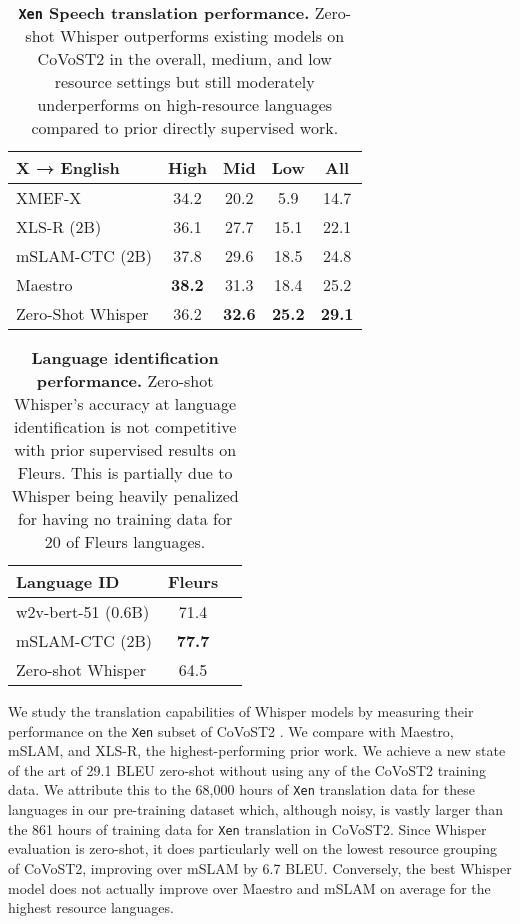 \documentclass[nohyperref]{article}
\theoremstyle{plain}
\theoremstyle{definition}
\theoremstyle{remark}
\begin{document}
\begin{table}[t]
\vskip 0.15in
\begin{center}
\begin{tabular}{l|ccc|c}
\toprule
 X → English & High & Mid & Low & All \\
\midrule
XMEF-X & 34.2 & 20.2 & 5.9 & 14.7 \\
XLS-R (2B) & 36.1 & 27.7 & 15.1 & 22.1 \\
mSLAM-CTC (2B) & 37.8 & 29.6 & 18.5 & 24.8 \\
Maestro & \textbf{38.2} & 31.3 & 18.4 & 25.2 \\
\midrule
Zero-Shot Whisper & 36.2 & \textbf{32.6} & \textbf{25.2} & \textbf{29.1} \\
\bottomrule
\end{tabular}
\caption{\textbf{\texttt{Xen} Speech translation performance.} Zero-shot Whisper outperforms existing models on CoVoST2 in the overall, medium, and low resource settings but still moderately underperforms on high-resource languages compared to prior directly supervised work.}
\label{translate_table}
\end{center}
\vspace{-1em}
\end{table}

\begin{table}[t]
\vskip 0.15in
\begin{center}
\begin{tabular}{l|cc}
\toprule
 Language ID & Fleurs \\
\midrule
w2v-bert-51 (0.6B) & 71.4 \\
mSLAM-CTC (2B) & \textbf{77.7} \\
\midrule
Zero-shot Whisper & 64.5 \\
\bottomrule
\end{tabular}
\caption{\textbf{Language identification performance.} Zero-shot Whisper's accuracy at language identification is not competitive with prior supervised results on Fleurs. This is partially due to Whisper being heavily penalized for having no training data for 20 of Fleurs languages.}
\label{lang_id_table}
\end{center}
\vspace{-1em}
\end{table}

We study the translation capabilities of Whisper models by measuring their performance on the \texttt{Xen} subset of CoVoST2 \cite{wang2020covost}. We compare with Maestro, mSLAM, and XLS-R, the highest-performing prior work. We achieve a new state of the art of 29.1 BLEU zero-shot without using any of the CoVoST2 training data. We attribute this to the 68,000 hours of \texttt{Xen} translation data for these languages in our pre-training dataset which, although noisy, is vastly larger than the 861 hours of training data for \texttt{Xen} translation in CoVoST2. Since Whisper evaluation is zero-shot, it does particularly well on the lowest resource grouping of CoVoST2, improving over mSLAM by 6.7 BLEU. Conversely, the best Whisper model does not actually improve over Maestro and mSLAM on average for the highest resource languages.
\end{document}
